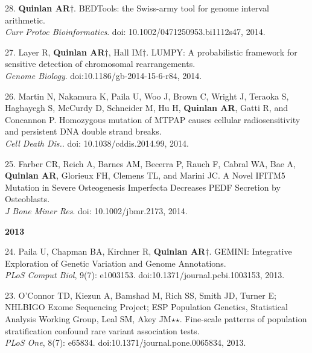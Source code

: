 \documentclass[margin,line]{cv}
\begin{document}
\begin{resume}
\begin{list}{*}{}
    \item[28.] \textbf{Quinlan AR}$\dagger$.
    BEDTools: the Swiss-army tool for genome interval arithmetic.\\
    \emph{Curr Protoc Bioinformatics}. doi: 10.1002/0471250953.bi1112s47, 2014.

    \item[27.] Layer R, \textbf{Quinlan AR}$\dagger$, Hall IM$\dagger$.
    LUMPY: A probabilistic framework for sensitive detection of chromosomal rearrangements.\\
    \emph{Genome Biology}. doi:10.1186/gb-2014-15-6-r84, 2014.

    \item[26.] Martin N, Nakamura K, Paila U, Woo J, Brown C, Wright J, Teraoka S, Haghayegh S, McCurdy D, Schneider M, Hu H, \textbf{Quinlan AR}, Gatti R, and Concannon P.
    Homozygous mutation of MTPAP causes cellular radiosensitivity and persistent DNA double strand breaks.\\
    \emph{Cell Death Dis.}. doi: 10.1038/cddis.2014.99, 2014.

    \item[25.] Farber CR, Reich A, Barnes AM, Becerra P, Rauch F, Cabral WA, Bae A, \textbf{Quinlan AR}, Glorieux FH, Clemens TL, and Marini JC.
    A Novel IFITM5 Mutation in Severe Osteogenesis Imperfecta Decreases PEDF Secretion by Osteoblasts.\\
    \emph{J Bone Miner Res}. doi: 10.1002/jbmr.2173, 2014.

    \end{list}

    \textbf{2013} \\
    \begin{list}{*}{}

    \item[24.] Paila U, Chapman BA, Kirchner R, \textbf{Quinlan AR}$\dagger$.
    GEMINI: Integrative Exploration of Genetic Variation and Genome Annotations.\\
    \emph{PLoS Comput Biol}, 9(7): e1003153. doi:10.1371/journal.pcbi.1003153, 2013.

    \item[23.] O'Connor TD, Kiezun A, Bamshad M, Rich SS, Smith JD, Turner E; NHLBIGO Exome Sequencing Project; ESP Population Genetics, Statistical Analysis Working Group, Leal SM, Akey JM$\star$$\star$. Fine-scale patterns of population stratification confound rare variant association tests.\\
    \emph{PLoS One}, 8(7): e65834. doi:10.1371/journal.pone.0065834, 2013.


\end{list}
\end{resume}
\end{document}
